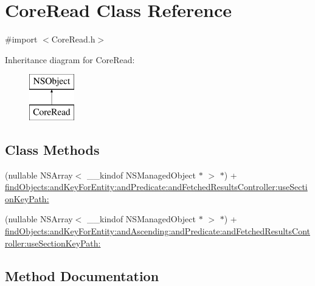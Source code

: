 \hypertarget{interface_core_read}{}\section{Core\+Read Class Reference}
\label{interface_core_read}


{\ttfamily \#import $<$Core\+Read.\+h$>$}

Inheritance diagram for Core\+Read\+:\begin{figure}[H]
\begin{center}
\leavevmode
\includegraphics[height=2.000000cm]{interface_core_read}
\end{center}
\end{figure}
\subsection*{Class Methods}
\begin{DoxyCompactItemize}
\item 
(nullable N\+S\+Array$<$ \+\_\+\+\_\+kindof N\+S\+Managed\+Object $\ast$ $>$ $\ast$) + \hyperlink{interface_core_read_a2e3b45347ade1da22f0df0829e405fee}{find\+Objects\+:and\+Key\+For\+Entity\+:and\+Predicate\+:and\+Fetched\+Results\+Controller\+:use\+Section\+Key\+Path\+:}
\item 
(nullable N\+S\+Array$<$ \+\_\+\+\_\+kindof N\+S\+Managed\+Object $\ast$ $>$ $\ast$) + \hyperlink{interface_core_read_a53531548daefda5f7c7a417a22f68748}{find\+Objects\+:and\+Key\+For\+Entity\+:and\+Ascending\+:and\+Predicate\+:and\+Fetched\+Results\+Controller\+:use\+Section\+Key\+Path\+:}
\end{DoxyCompactItemize}


\subsection{Method Documentation}
\hypertarget{interface_core_read_a53531548daefda5f7c7a417a22f68748}{}\label{interface_core_read_a53531548daefda5f7c7a417a22f68748} 

